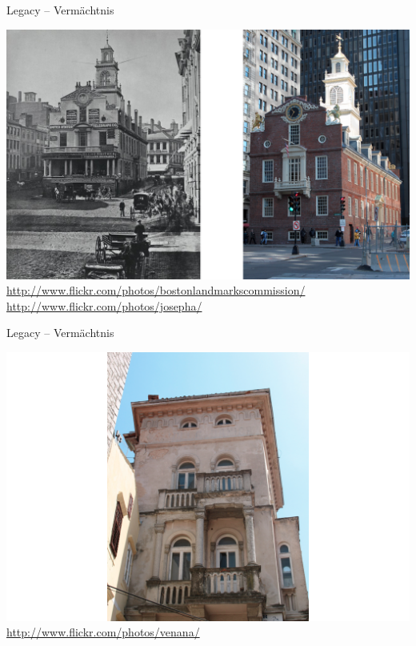 \begin{frame}[fragile]{Legacy -- Vermächtnis}
\begin{minipage}{.8 \paperwidth}
\includegraphics[width=\textwidth]{OldStateHouse.png} \newline
{\tiny \url{http://www.flickr.com/photos/bostonlandmarkscommission/} \hfill \url{http://www.flickr.com/photos/josepha/}}
\end{minipage}
\end{frame}

\begin{frame}[fragile]{Legacy -- Vermächtnis}
\begin{minipage}{.8 \paperwidth}
\includegraphics[width=\textwidth]{AlteVilla.png} \newline
{\tiny \hspace*{\fill} \url{http://www.flickr.com/photos/venana/}}
\end{minipage}
\end{frame}

